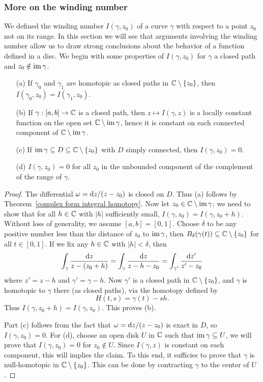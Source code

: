 \subsubsection{More on the winding number}
We defined the winding number $I(\gamma,z_0)$ of a curve $\gamma$ with respect to a point $z_0$ not on its range. In this section we will see that arguments involving the winding number allow us to draw strong conclusions about the behavior of a function defined in a disc.
We begin with some properties of $I(\gamma,z_0)$ for $\gamma$ a closed path and $z_0\notin\mathrm{im}\,\gamma$.
\begin{proposition}
\mbox{}
\begin{itemize}
\item[(a)] If $\gamma_0$ and $\gamma_1$ are homotopic as closed paths in $\mathbb{C}\setminus\{z_0\}$, then $I(\gamma_0,z_0)=I(\gamma_1,z_0)$.
\item[(b)] If $\gamma:[a,b]\to\mathbb{C}$ is a closed path, then $z\mapsto I(\gamma,z)$ is a locally constant function on the open set $\mathbb{C}\setminus\mathrm{im}\,\gamma$, hence it is constant on each connected component of $\mathbb{C}\setminus\mathrm{im}\,\gamma$.
\item[(c)] If $\mathrm{im}\,\gamma\subseteq D\subseteq\mathbb{C}\setminus\{z_0\}$ with $D$ simply connected, then $I(\gamma,z_0)=0$.
\item[(d)] $I(\gamma,z_0)=0$ for all $z_0$ in the unbounded component of the complement of the range of $\gamma$.
\end{itemize}
\end{proposition}
\begin{proof}
The differential $\omega=\mathop{}\!\mathrm{d} z/(z-z_0)$ is closed on $D$. Thus (a) follows by Theorem~\ref{complex form integral homotopy}. Now let $z_0\in\mathbb{C}\setminus\mathrm{im}\,\gamma$; we need to show that for all $h\in\mathbb{C}$ with $|h|$ sufficiently small, $I(\gamma,z_0)=I(\gamma,z_0+h)$. Without loss of generality, we assume $[a,b]=[0,1]$. Choose $\delta$ to be any positive number less than the distance of $z_0$ to $\mathrm{im}\,\gamma$, then $B_{\delta}(\gamma(t))\subseteq\mathbb{C}\setminus\{z_0\}$ for all $t\in[0,1]$. If we fix any $h\in\mathbb{C}$ with $|h|<\delta$, then
\[\int_{\gamma}\frac{\mathop{}\!\mathrm{d} z}{z-(z_0+h)}=\int_{\gamma}\frac{\mathop{}\!\mathrm{d} z}{z-h-z_0}=\int_{\gamma'}\frac{\mathop{}\!\mathrm{d} z'}{z'-z_0}\]
where $z'=z-h$ and $\gamma'=\gamma-h$. Now $\gamma'$ is a closed path in $\mathbb{C}\setminus\{z_0\}$, and $\gamma$ is homotopic to $\gamma$ there (as closed paths), via the homotopy defined by
\[H(t,s)=\gamma(t)-sh.\]
Thus $I(\gamma,z_0+h)=I(\gamma,z_0)$. This proves (b).\par
Part (c) follows from the fact that $\omega=\mathop{}\!\mathrm{d} z/(z-z_0)$ is exact in $D$, so $I(\gamma,z_0)=0$. For (d), choose an open disk $U$ in $\mathbb{C}$ such that $\mathrm{im}\,\gamma\subseteq U$, we will prove that $I(\gamma,z_0)=0$ for $z_0\notin U$. Since $I(\gamma,z)$ is constant on each component, this will implies the claim. To this end, it sufficies to prove that $\gamma$ is null-homotopic in $\mathbb{C}\setminus\{z_0\}$. This can be done by contracting $\gamma$ to the center of $U$.
\end{proof}
